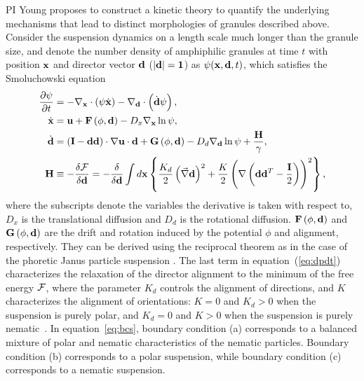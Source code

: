 %
PI Young proposes to construct a kinetic theory to quantify the underlying 
mechanisms that lead to distinct morphologies of granules described above.
Consider the suspension dynamics on a length scale much longer than the granule size, 
and denote the number density of 
amphiphilic granules at time $t$ with position ${\bf x}$ and director vector ${\bf d}$ 
($|\bf d|=1$) as $\psi({\bf x}, {\bf d},t)$, which satisfies the 
Smoluchowski equation 
\begin{align}
\frac{\partial \psi}{\partial t} &= -\nabla_{\bf x} \cdot\left(\psi\dot{\bf x}\right) - \nabla_{\bf d}\cdot\left(\dot{\bf d}\psi\right),\\
\dot{\bf x} &= {\bf u} + {\bf F}\left(\phi,{\bf d}\right) - D_x\nabla_{\bf x}\ln\psi,\\
\label{eq:dpdt}
\dot{\bf d} &= \left({\bf I}-{\bf d}{\bf d}\right)\cdot\nabla {\bf u}\cdot {\bf d} + {\bf G}\left(\phi,{\bf d}\right) - D_d \nabla_{\bf d}\ln \psi + \frac{{\bf H}}{\gamma},\\
{\bf H} &\equiv -\frac{\delta {\cal F}}{\delta {\bf d}} = -\frac{\delta}{\delta {\bf d}} 
\int d{\bf x} \left\{\frac{K_d}{2} \left(\vec\nabla{\bf d}\right)^2 + \frac{K}{2}\left(\nabla\left({\bf d}{\bf d}^T- \frac{\bf I}{2}\right)\right)^2\right\},
\end{align}
where the subscripts denote the variables the derivative is taken with
respect to, $D_x$ is the translational diffusion and $D_d$ is the
rotational diffusion. ${\bf F}\left(\phi,{\bf d}\right)$ and ${\bf
G}\left(\phi,{\bf d}\right)$ are the drift and rotation induced by the
potential $\phi$ and alignment, respectively. They can be derived using
the reciprocal theorem as in the case of the phoretic Janus particle
suspension \cite{TraversoMichellin2020_PRF,TraversoMichellin2022_JFM}.
The last term in equation~(\ref{eq:dpdt}) characterizes the relaxation
of the director alignment to the minimum of the free energy ${\cal F}$,
where the parameter $K_d$ controls the alignment of directions, and $K$
characterizes the alignment of orientations: $K=0$ and $K_d > 0$ when
the suspension is purely polar, and $K_d=0$ and $K>0$ when the
suspension is purely nematic~\cite{Amiri2022_JPhysA}. 
%
In equation~\eqref{eq:bcs}, boundary condition (a) corresponds to a
balanced mixture of polar and nematic characteristics of the nematic
particles. Boundary condition (b) corresponds to a polar suspension,
while boundary condition (c) corresponds to a nematic suspension. 

